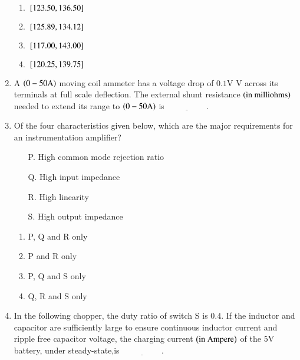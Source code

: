 \documentclass[journal]{IEEEtran}
\begin{document}
\begin{enumerate}
\begin{figure}[H]
\end{figure}
\begin{enumerate}
        \item ${}\left[123.50,136.50\right]$
        \item ${}\left[125.89,134.12\right]$
        \item ${}\left[117.00,143.00\right]$
        \item ${}\left[120.25,139.75\right]$
\end{enumerate}
\bigskip
\item A $\left(0-50\text{A}\right)$ moving coil ammeter has a voltage drop of $0.1$V V across its terminals at full scale deflection. The external shunt resistance $\left(\text{in milliohms}\right)$ needed to extend its range to $\left(0-50\text{A}\right)$ is $\underline{\hspace{2cm}}.$
\bigskip
\item Of the four characteristics given below, which are the major requirements for an instrumentation amplifier? 
\begin{enumerate}[label=\Alph*]
    \item[P.] High common mode rejection ratio
    \item[Q.] High input impedance
    \item[R.] High linearity
    \item[S.] High output impedance
\end{enumerate}
\begin{multicols}{2}
    \begin{enumerate}
        \item P, Q and R only
        \item P and R only
        \item P, Q and S only
        \item Q, R and S only
    \end{enumerate}
\end{multicols}
\bigskip
\item In the following chopper, the duty ratio of switch S is $0.4$. If the inductor and capacitor are sufficiently large to ensure continuous inductor current and ripple free capacitor voltage, the charging current $\left(\text{in Ampere}\right)$ of the $5$V battery, under steady-state,is $\underline{\hspace{2cm}}.$
\begin{figure}[H]
\centering
{}
\end{figure}
\end{enumerate}
\end{document}

